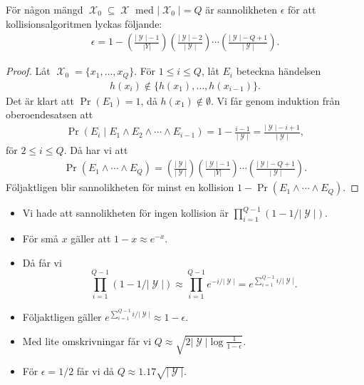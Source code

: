\documentclass{beamer}
\theoremstyle{definition}
\DeclareMathOperator{\X}{\mathcal{X}}
\DeclareMathOperator{\Y}{\mathcal{Y}}
\begin{document}
\begin{frame}{\insertsubsectionhead}
  \begin{theorem}
    För någon mängd \(\X_0\subseteq \X\) med \(|\X_0| = Q\) är sannolikheten 
    \(\epsilon\) för att kollisionsalgoritmen lyckas följande:
    \begin{align*}
      \epsilon = 1 - \left(\frac{|\Y|-1}{|Y|}\right)
        \left(\frac{|\Y|-2}{|\Y|}\right) \cdots
        \left(\frac{|\Y|-Q+1}{|\Y|}\right).
    \end{align*}
  \end{theorem}
\end{frame}
\begin{frame}{\insertsubsectionhead}
  \begin{proof}
    \small
    Låt \(\X_0 = \{x_1, \ldots, x_Q\}\).
    För \(1\leq i\leq Q\), låt \(E_i\) beteckna händelsen
    \begin{align*}
      h(x_i)\notin \{h(x_1), \ldots, h(x_{i-1})\}.
    \end{align*}
    Det är klart att \(\Pr(E_1) = 1\), då \(h(x_1)\notin \emptyset\).
    Vi får genom induktion från oberoendesatsen att
    \begin{align*}
      \Pr(E_i\mid E_1\land E_2\land \cdots\land E_{i-1}) = 1 - \frac{i-1}{|\Y|} 
      = \frac{|\Y|-i+1}{|\Y|},
    \end{align*}
    för \(2\leq i\leq Q\).
    Då har vi att
    \begin{align*}
      \Pr(E_1\land \cdots\land E_Q) = \left(\frac{|\Y|}{|\Y|}\right)
        \left(\frac{|\Y|-1}{|Y|}\right)\cdots
        \left(\frac{|\Y|-Q+1}{|\Y|}\right).
    \end{align*}
    Följaktligen blir sannolikheten för minst en kollision \(1 - \Pr(E_1\land 
    \cdots\land E_Q)\).
  \end{proof}
\end{frame}
\begin{frame}{\insertsubsectionhead}
  \begin{itemize}
    \item Vi hade att sannolikheten för ingen kollision är 
      \(\prod_{i=1}^{Q-1}(1 - 1/|\Y|)\).
    \item För små \(x\) gäller att \(1 - x\approx e^{-x}\).
    \item Då får vi \[\prod_{i=1}^{Q-1}(1-1/|\Y|)\approx \prod_{i=1}^{Q-1} 
      e^{-i/|\Y|} = e^{\sum_{i=1}^{Q-1} i/|\Y|}.\]
    \item Följaktligen gäller \(e^{\sum_{i=1}^{Q-1} i/|\Y|}\approx 
      1-\epsilon\).
    \item Med lite omskrivningar får vi \(Q\approx 
      \sqrt{2|\Y|\log\frac{1}{1-\epsilon}}\).
    \item För \(\epsilon = 1/2\) får vi då \(Q\approx 1.17\sqrt{|\Y|}\).
  \end{itemize}
\end{frame}
\end{document}
